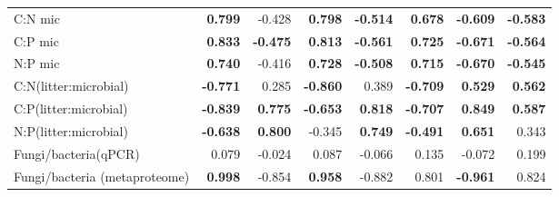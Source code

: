 \documentclass[10pt]{article}
\begin{document}
\begin{flushleft}
\begin{landscape}
\begin{table}[h!]
{\begin{tabular}{lrrrrrrr}
  C:N mic & \textbf{ 0.799 } & -0.428 & \textbf{ 0.798 } & \textbf{ -0.514 } & \textbf{ 0.678 } & \textbf{ -0.609 } & \textbf{ -0.583 } \\ 
  C:P mic & \textbf{ 0.833 } & \textbf{ -0.475 } & \textbf{ 0.813 } & \textbf{ -0.561 } & \textbf{ 0.725 } & \textbf{ -0.671 } & \textbf{ -0.564 } \\ 
  N:P mic & \textbf{ 0.740 } & -0.416 & \textbf{ 0.728 } & \textbf{ -0.508 } & \textbf{ 0.715 } & \textbf{ -0.670 } & \textbf{ -0.545 } \\ 
  C:N(litter:microbial) & \textbf{ -0.771 } & 0.285 & \textbf{ -0.860 } & 0.389 & \textbf{ -0.709 } & \textbf{ 0.529 } & \textbf{ 0.562 } \\ 
  C:P(litter:microbial) & \textbf{ -0.839 } & \textbf{ 0.775 } & \textbf{ -0.653 } & \textbf{ 0.818 } & \textbf{ -0.707 } & \textbf{ 0.849 } & \textbf{ 0.587 } \\ 
  N:P(litter:microbial) & \textbf{ -0.638 } & \textbf{ 0.800 } & -0.345 & \textbf{ 0.749 } & \textbf{ -0.491 } & \textbf{ 0.651 } & 0.343 \\ 
  Fungi/bacteria(qPCR) & 0.079 & -0.024 & 0.087 & -0.066 & 0.135 & -0.072 & 0.199 \\ 
  Fungi/bacteria (metaproteome) & \textbf{ 0.998 } & -0.854 & \textbf{ 0.958 } & -0.882 & 0.801 & \textbf{ -0.961 } & 0.824 \\ 
   \hline
\end{tabular}
}
\end{table}



\end{landscape}
\end{flushleft}
\end{document}
